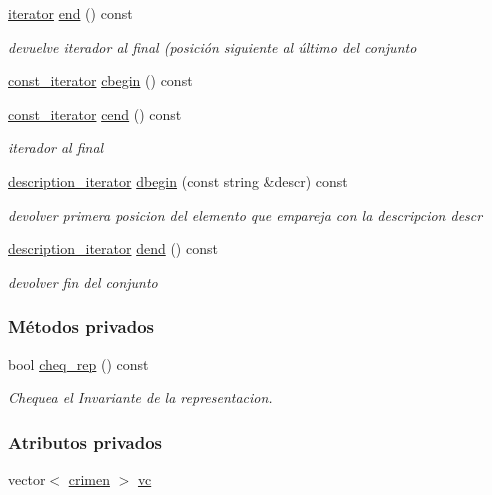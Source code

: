\begin{DoxyCompactItemize}
\hyperlink{classconjunto_1_1iterator}{iterator} \hyperlink{classconjunto_ae143234a24189d96ff6824031a127a28}{end} () const 
\begin{DoxyCompactList}\small\item\em devuelve iterador al final (posición siguiente al último del conjunto \end{DoxyCompactList}\item 
\hyperlink{classconjunto_1_1const__iterator}{const\+\_\+iterator} \hyperlink{classconjunto_a7933f91ed5906a9545f682572cb687f6}{cbegin} () const 
\item 
\hyperlink{classconjunto_1_1const__iterator}{const\+\_\+iterator} \hyperlink{classconjunto_ab29b3d1855e631625dab94db9af9ee9c}{cend} () const 
\begin{DoxyCompactList}\small\item\em iterador al final \end{DoxyCompactList}\item 
\hyperlink{classconjunto_1_1description__iterator}{description\+\_\+iterator} \hyperlink{classconjunto_ac40bafea5d9dc529c96cf0e5977100c6}{dbegin} (const string \&descr) const 
\begin{DoxyCompactList}\small\item\em devolver primera posicion del elemento que empareja con la descripcion descr \end{DoxyCompactList}\item 
\hyperlink{classconjunto_1_1description__iterator}{description\+\_\+iterator} \hyperlink{classconjunto_aaff3013d49c52c4d3177168338725756}{dend} () const 
\begin{DoxyCompactList}\small\item\em devolver fin del conjunto \end{DoxyCompactList}\end{DoxyCompactItemize}
\subsubsection*{Métodos privados}
\begin{DoxyCompactItemize}
\item 
bool \hyperlink{classconjunto_adb0ff15cf65817b0b279bae4bf06decb}{cheq\+\_\+rep} () const 
\begin{DoxyCompactList}\small\item\em Chequea el Invariante de la representacion. \end{DoxyCompactList}\end{DoxyCompactItemize}
\subsubsection*{Atributos privados}
\begin{DoxyCompactItemize}
\item 
vector$<$ \hyperlink{classcrimen}{crimen} $>$ \hyperlink{classconjunto_aed485e92bb3d8b2c82fc85657947761d}{vc}
\end{DoxyCompactItemize}
